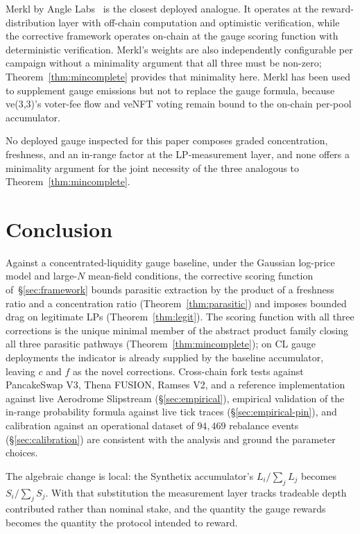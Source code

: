 \documentclass[11pt,a4paper]{article}
\theoremstyle{cgdefinition}
\theoremstyle{cgplain}
\theoremstyle{cgremark}
\begin{document}
Merkl by Angle Labs~\cite{merkl2023} is the closest deployed analogue. It operates at the reward-distribution layer with off-chain computation and optimistic verification, while the corrective framework operates on-chain at the gauge scoring function with deterministic verification. Merkl's weights are also independently configurable per campaign without a minimality argument that all three must be non-zero; Theorem~\ref{thm:mincomplete} provides that minimality here. Merkl has been used to supplement gauge emissions but not to replace the gauge formula, because ve(3,3)'s voter-fee flow and veNFT voting remain bound to the on-chain per-pool accumulator.

No deployed gauge inspected for this paper composes graded concentration, freshness, and an in-range factor at the LP-measurement layer, and none offers a minimality argument for the joint necessity of the three analogous to Theorem~\ref{thm:mincomplete}.

\section{Conclusion}\label{sec:conclusion}

Against a concentrated-liquidity gauge baseline, under the Gaussian log-price model and large-$N$ mean-field conditions, the corrective scoring function of~\S\ref{sec:framework} bounds parasitic extraction by the product of a freshness ratio and a concentration ratio (Theorem~\ref{thm:parasitic}) and imposes bounded drag on legitimate LPs (Theorem~\ref{thm:legit}). The scoring function with all three corrections is the unique minimal member of the abstract product family closing all three parasitic pathways (Theorem~\ref{thm:mincomplete}); on CL gauge deployments the indicator is already supplied by the baseline accumulator, leaving $c$ and $f$ as the novel corrections. Cross-chain fork tests against PancakeSwap V3, Thena FUSION, Ramses V2, and a reference implementation against live Aerodrome Slipstream (\S\ref{sec:empirical}), empirical validation of the in-range probability formula against live tick traces (\S\ref{sec:empirical-pin}), and calibration against an operational dataset of $94{,}469$ rebalance events (\S\ref{sec:calibration}) are consistent with the analysis and ground the parameter choices.

The algebraic change is local: the Synthetix accumulator's $L_i/\sum_j L_j$ becomes $S_i/\sum_j S_j$. With that substitution the measurement layer tracks tradeable depth contributed rather than nominal stake, and the quantity the gauge rewards becomes the quantity the protocol intended to reward.
\end{document}

